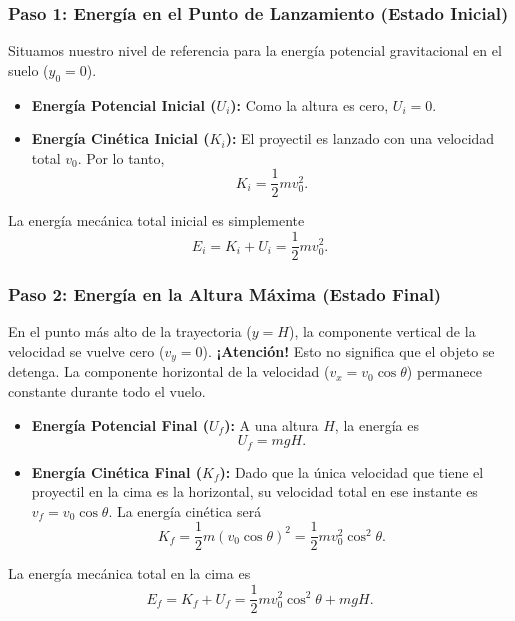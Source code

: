 \documentclass[11pt,a4paper]{book}
\begin{document}
\subsubsection*{Paso 1: Energía en el Punto de Lanzamiento (Estado Inicial)}
Situamos nuestro nivel de referencia para la energía potencial gravitacional en el suelo ($y_0 = 0$).
\begin{itemize}
    \item \textbf{Energía Potencial Inicial ($U_i$):} Como la altura es cero, $U_i = 0$.
    \item \textbf{Energía Cinética Inicial ($K_i$):} El proyectil es lanzado con una velocidad total $v_0$. Por lo tanto,
    \begin{equation}
        K_i = \frac{1}{2} m v_0^2.
    \end{equation}
\end{itemize}
La energía mecánica total inicial es simplemente
\begin{equation}
    E_i = K_i + U_i = \frac{1}{2} m v_0^2.
    \label{eq:energia_inicial_parabola}
\end{equation}

\subsubsection*{Paso 2: Energía en la Altura Máxima (Estado Final)}
En el punto más alto de la trayectoria ($y = H$), la componente vertical de la velocidad se vuelve cero ($v_y = 0$). \textbf{¡Atención!} Esto no significa que el objeto se detenga. La componente horizontal de la velocidad ($v_x = v_0 \cos\theta$) permanece constante durante todo el vuelo.
\begin{itemize}
    \item \textbf{Energía Potencial Final ($U_f$):} A una altura $H$, la energía es
    \begin{equation}
        U_f = mgH.
    \end{equation}
    \item \textbf{Energía Cinética Final ($K_f$):} Dado que la única velocidad que tiene el proyectil en la cima es la horizontal, su velocidad total en ese instante es $v_f = v_0 \cos\theta$. La energía cinética será
    \begin{equation}
        K_f = \frac{1}{2} m (v_0 \cos\theta)^2 = \frac{1}{2} m v_0^2 \cos^2\theta.
    \end{equation}
\end{itemize}
La energía mecánica total en la cima es
\begin{equation}
    E_f = K_f + U_f = \frac{1}{2} m v_0^2 \cos^2\theta + mgH.
    \label{eq:energia_final_parabola}
\end{equation}
\end{document}
